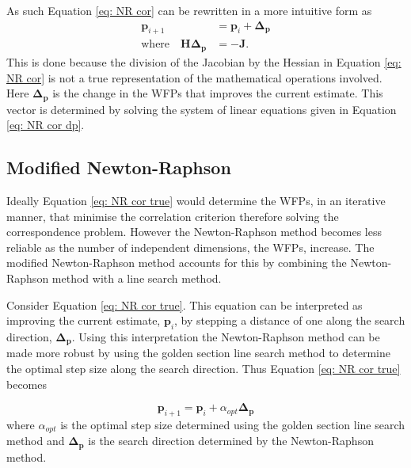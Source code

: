 \documentclass[12pt,oneside,openany,a4paper, %
english, %
masters-t, goldenblock]{usthesis}
\begin{document}
As such Equation \ref{eq: NR cor} can be rewritten in a more intuitive form as
\begin{align}
  \label{eq: NR cor true}
  \bm{p}_{i+1}&=\bm{p}_i + \bm{\Delta_p} \\
  \text{where} \quad \bm{H} \bm{\Delta_p}&= - \bm{J} \label{eq: NR cor dp}.
\end{align}
This is done because the division of the Jacobian by the Hessian in Equation \ref{eq: NR cor} is not a true representation of the mathematical operations involved. Here $\bm{\Delta_p}$ is the change in the WFPs that improves the current estimate. This vector is determined by solving the system of linear equations given in Equation \ref{eq: NR cor dp}. 

\subsection{Modified Newton-Raphson}
Ideally Equation \ref{eq: NR cor true} would determine the WFPs, in an iterative manner, that minimise the correlation criterion therefore solving the correspondence problem. However the Newton-Raphson method becomes less reliable as the number of independent dimensions, the WFPs, increase.  
The modified Newton-Raphson method accounts for this by combining the Newton-Raphson method with a line search method.

Consider Equation \ref{eq: NR cor true}. This equation can be interpreted as improving the current estimate, $\bm{p}_i$, by stepping a distance of one along the search direction, $\bm{\Delta_p}$. Using this interpretation the Newton-Raphson method can be made more robust by using the golden section line search method to determine the optimal step size along the search direction. Thus Equation \ref{eq: NR cor true} becomes


\begin{equation}
  \label{eq: Newton update}
  \bm{p}_{i+1}=\bm{p}_i + \alpha_{opt} \bm{\Delta_p}
\end{equation}
where $\alpha_{opt}$ is the optimal step size determined using the golden section line search method and $\bm{\Delta_p}$ is the search direction determined by the Newton-Raphson method.
\end{document}
